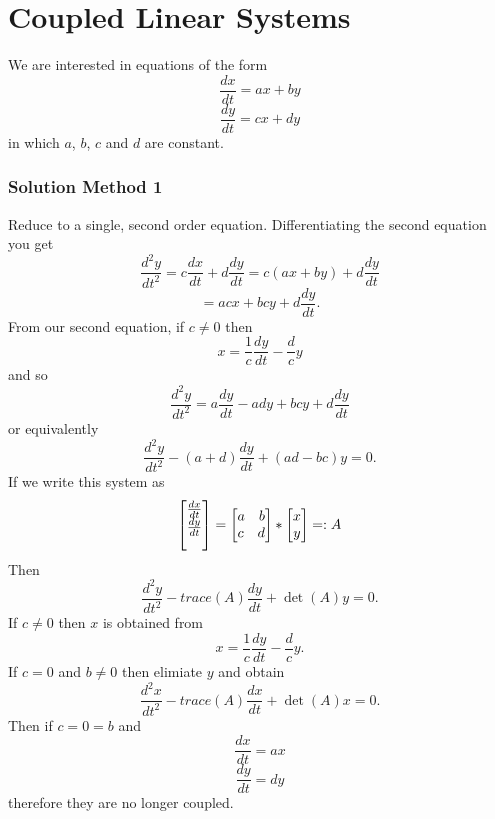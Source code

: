 \section{Coupled Linear Systems}
We are interested in equations of the form $$\frac{dx}{dt} = ax+by$$ $$\frac{dy}{dt} = cx+dy$$ in which $a$, $b$, $c$ and $d$ are constant.
\subsubsection*{Solution Method 1}
Reduce to a single, second order equation. Differentiating the second equation you get $$\frac{d^2y}{dt^2}= c\frac{dx}{dt}+d\frac{dy}{dt} = c(ax+by)+d\frac{dy}{dt}$$ $$ = acx+bcy +d\frac{dy}{dt}.$$ From our second equation, if $c\neq 0$ then $$x = \frac{1}{c}\frac{dy}{dt}-\frac{d}{c}y$$ and so $$\frac{d^2y}{dt^2}= a\frac{dy}{dt}-ady+bcy+d\frac{dy}{dt}$$ or equivalently 
$$\frac{d^2y}{dt^2}-(a+d)\frac{dy}{dt}+(ad-bc)y=0.$$
If we write this system as $$\begin{bmatrix}
\frac{dx}{dt}\\
\vspace{10pt}
\frac{dy}{dt}\\
\end{bmatrix} = \begin{bmatrix}
a \hspace{10pt} b \\
c \hspace{10pt} d \\
\end{bmatrix} * \begin{bmatrix}
x \\
y \\
\end{bmatrix} =:A$$ Then $$\frac{d^2y}{dt^2}-trace(A)\frac{dy}{dt}+\det(A)y = 0.$$
If $c \neq 0$ then $x$ is obtained from $$x = \frac{1}{c}\frac{dy}{dt}-\frac{d}{c}y.$$ If $c = 0$ and $b \neq 0$ then elimiate $y$ and obtain $$\frac{d^2x}{dt^2}-trace(A)\frac{dx}{dt}+\det(A)x = 0.$$ Then if $c=0=b$ and $$\frac{dx}{dt} = ax$$ $$\frac{dy}{dt} =dy$$ therefore they are no longer coupled.
